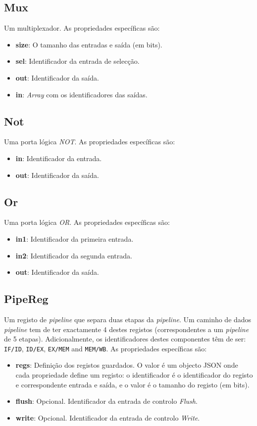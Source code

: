 \documentclass[11pt,a4paper,twoside,titlepage]{report}
\begin{document}
\subsection{Mux}

Um multiplexador. As propriedades específicas são:
\begin{itemize}
	\item \textbf{size}: O tamanho das entradas e saída (em bits).
	\item \textbf{sel}: Identificador da entrada de selecção.
	\item \textbf{out}: Identificador da saída.
	\item \textbf{in}: \emph{Array} com os identificadores das saídas.
\end{itemize}

\subsection{Not}

Uma porta lógica \emph{NOT}. As propriedades específicas são:
\begin{itemize}
	\item \textbf{in}: Identificador da entrada.
	\item \textbf{out}: Identificador da saída.
\end{itemize}

\subsection{Or}

Uma porta lógica \emph{OR}. As propriedades específicas são:
\begin{itemize}
	\item \textbf{in1}: Identificador da primeira entrada.
	\item \textbf{in2}: Identificador da segunda entrada.
	\item \textbf{out}: Identificador da saída.
\end{itemize}

\subsection{PipeReg}

Um registo de \emph{pipeline} que separa duas etapas da \emph{pipeline}.
Um caminho de dados \emph{pipeline} tem de ter exactamente 4 destes registos
(correspondentes a um \emph{pipeline} de 5 etapas). Adicionalmente, os
identificadores destes componentes têm de ser:
\verb+IF/ID+, \verb+ID/EX+, \verb+EX/MEM+ and \verb+MEM/WB+.
As propriedades específicas são:
\begin{itemize}
	\item \textbf{regs}: Definição dos registos guardados. O valor é um objecto
		JSON onde cada propriedade define um registo: o identificador é o
		identificador do registo e correspondente entrada e saída, e o valor é o
		tamanho do registo (em bits).
	\item \textbf{flush}: Opcional. Identificador da entrada de controlo \emph{Flush}.
	\item \textbf{write}: Opcional. Identificador da entrada de controlo \emph{Write}.
\end{itemize}
\end{document}
